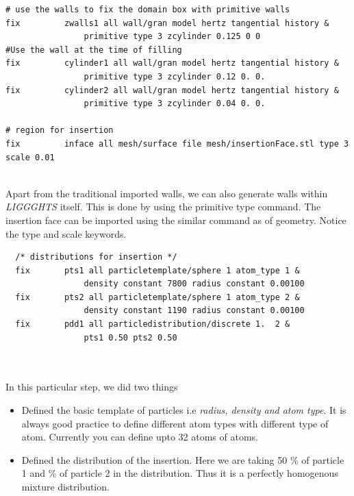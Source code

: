 \documentclass{tufte-book} %
\newcommand{\Li}{\textit{LIGGGHTS}\xspace}
\begin{document}
  \begin{verbatim}
# use the walls to fix the domain box with primitive walls
fix 		zwalls1 all wall/gran model hertz tangential history &
                primitive type 3 zcylinder 0.125 0 0
#Use the wall at the time of filling
fix 		cylinder1 all wall/gran model hertz tangential history &
                primitive type 3 zcylinder 0.12 0. 0. 
fix 		cylinder2 all wall/gran model hertz tangential history &
                primitive type 3 zcylinder 0.04 0. 0. 

# region for insertion
fix 		inface all mesh/surface file mesh/insertionFace.stl type 3 scale 0.01


\end{verbatim}
Apart from the traditional imported walls, we can also generate walls within \Li itself. This is done by using the primitive type command. 
The insertion face can be imported using the similar command as of geometry. Notice the type and scale keywords.
\begin{verbatim}
  /* distributions for insertion */
  fix		pts1 all particletemplate/sphere 1 atom_type 1 &
                density constant 7800 radius constant 0.00100
  fix		pts2 all particletemplate/sphere 1 atom_type 2 &
                density constant 1190 radius constant 0.00100
  fix		pdd1 all particledistribution/discrete 1.  2 &
                pts1 0.50 pts2 0.50



              \end{verbatim}
In this particular step, we did two things
\begin{itemize}
\item Defined the basic template of particles i.e \textit{radius, density and atom type}. It is always good practice to define different atom types with different type of atom. Currently you can define upto 32 atoms of atoms.
\item Defined the distribution of the insertion. Here we are taking 50 \% of particle 1 and \% of particle 2 in the distribution. Thus it is a perfectly homogenous mixture distribution.
\end{itemize}
\end{document}
